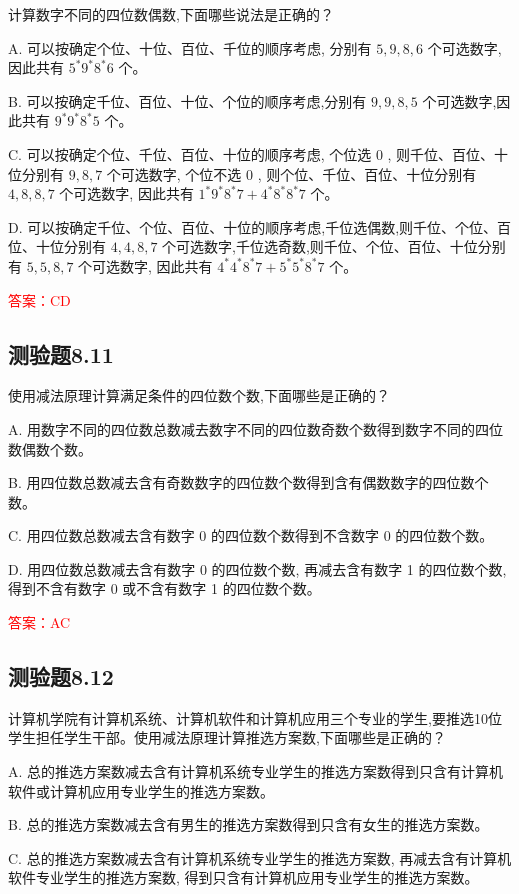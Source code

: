 \documentclass[UTF8, heading=true]{ctexart}
\begin{document}
计算数字不同的四位数偶数,下面哪些说法是正确的？

A. 可以按确定个位、十位、百位、千位的顺序考虑, 分别有 $5,9,8,6$ 个可选数字, 因此共有 $5^* 9^* 8^* 6$ 个。

B. 可以按确定千位、百位、十位、个位的顺序考虑,分别有 $9,9,8,5$ 个可选数字,因此共有 $9^* 9^* 8^* 5$ 个。

C. 可以按确定个位、千位、百位、十位的顺序考虑, 个位选 0 , 则千位、百位、十位分别有 $9,8,7$ 个可选数字, 个位不选 0 , 则个位、千位、百位、十位分别有 $4,8,8,7$ 个可选数字, 因此共有 $1 ^* 9^* 8^* 7+4^* 8^* 8^* 7$ 个。

D. 可以按确定千位、个位、百位、十位的顺序考虑,千位选偶数,则千位、个位、百位、十位分别有 $4,4,8,7$ 个可选数字,千位选奇数,则千位、个位、百位、十位分别有 $5,5,8,7$ 个可选数字, 因此共有 $4^* 4^* 8^* 7+5^* 5^* 8^* 7$ 个。

\textcolor{red}{答案：CD}

\subsection{测验题8.11}

使用减法原理计算满足条件的四位数个数,下面哪些是正确的？

A. 用数字不同的四位数总数减去数字不同的四位数奇数个数得到数字不同的四位数偶数个数。

B. 用四位数总数减去含有奇数数字的四位数个数得到含有偶数数字的四位数个数。

C. 用四位数总数减去含有数字 0 的四位数个数得到不含数字 0 的四位数个数。

D. 用四位数总数减去含有数字 0 的四位数个数, 再减去含有数字 1 的四位数个数, 得到不含有数字 0 或不含有数字 1 的四位数个数。

\textcolor{red}{答案：AC}

\subsection{测验题8.12}

计算机学院有计算机系统、计算机软件和计算机应用三个专业的学生,要推选10位学生担任学生干部。使用减法原理计算推选方案数,下面哪些是正确的？

A. 总的推选方案数减去含有计算机系统专业学生的推选方案数得到只含有计算机软件或计算机应用专业学生的推选方案数。

B. 总的推选方案数减去含有男生的推选方案数得到只含有女生的推选方案数。

C. 总的推选方案数减去含有计算机系统专业学生的推选方案数, 再减去含有计算机软件专业学生的推选方案数, 得到只含有计算机应用专业学生的推选方案数。
\end{document}
